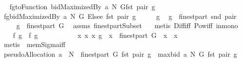 \begin{isabellebody}
\isamarkupfalse%
\ {\isacharminus}\isanewline
{}\isamarkupfalse%
\ {\isacharquery}f{}{\isacharequal}{\isachardoublequoteopen}{\isacharpercent}g{\isachardot}{\isacharparenleft}toFunction\ {\isacharparenleft}bidMaximizedBy\ a\ N\ G{\isacharparenright}{\isacharparenright}{\isacharparenleft}fst\ pair{\isacharcomma}\ g{\isacharparenright}{\isachardoublequoteclose}\isanewline
{}\isamarkupfalse%
\ {\isacharquery}f{}{\isacharequal}{\isachardoublequoteopen}{\isacharpercent}g{\isachardot}{\isacharparenleft}{\isacharparenleft}bidMaximizedBy\ a\ N\ G{\isacharparenright}\ Elsee\ {}{\isacharparenright}{\isacharparenleft}fst\ pair{\isacharcomma}\ g{\isacharparenright}{\isachardoublequoteclose}\isanewline
\isacommand{{\isacharbraceleft}}\isamarkupfalse%
\ \isanewline
\ \ \isamarkupfalse%
\ g\ \isamarkupfalse%
\ {\isachardoublequoteopen}g\ {\isasymin}\ finestpart\ {\isacharparenleft}snd\ pair{\isacharparenright}{\isachardoublequoteclose}\ \isamarkupfalse%
\ \isamarkupfalse%
\ \isanewline
\ \ {}{\isacharcolon}\ {\isachardoublequoteopen}g\ {\isasymin}\ finestpart\ G{\isachardoublequoteclose}\ \isamarkupfalse%
\ assms\ finestpartSubset\ \ \isamarkupfalse%
\ {\isacharparenleft}metis\ Diff{\isacharunderscore}iff\ Pow{\isacharunderscore}iff\ in{\isacharunderscore}mono{\isacharparenright}\isanewline
\ \ \isamarkupfalse%
\ {\isachardoublequoteopen}{\isacharquery}f{}\ g\ {\isacharequal}\ {\isacharquery}f{}\ g{\isachardoublequoteclose}\ \isanewline
\ \ \isamarkupfalse%
\ {\isacharminus}\isanewline
\ \ \ \ \isamarkupfalse%
\ {\isachardoublequoteopen}{\isasymAnd}x\ x\ {\isacharparenleft}x\ g{\isacharparenright}\ {\isasymin}\ x\ {\isasymtimes}\ finestpart\ G\ {\isasymor}\ x\ {\isasymnotin}\ x\ \isamarkupfalse%
\ {\isacharparenleft}metis\ {}\ mem{\isacharunderscore}Sigma{\isacharunderscore}iff{\isacharparenright}\ \isanewline
\ \ \ \ \isamarkupfalse%
\ \isamarkupfalse%
\ {\isachardoublequoteopen}{\isacharparenleft}pseudoAllocation\ a\ {\isacharless}{\isacharbar}\ {\isacharparenleft}N\ {\isasymtimes}\ finestpart\ G{\isacharparenright}{\isacharparenright}\ {\isacharparenleft}fst\ pair{\isacharcomma}\ g{\isacharparenright}\ {\isacharequal}\ maxbid\ a\ N\ G\ {\isacharparenleft}fst\ pair{\isacharcomma}\ g{\isacharparenright}{\isachardoublequoteclose}\isanewline

\end{isabellebody}
